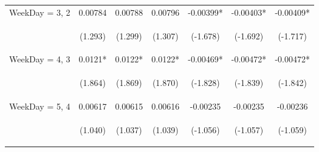 \documentclass[]{article}
\begin{document}
\begin{center}
\begin{tabular}{lcccccc}
WeekDay = 3, 2 & 0.00784 & 0.00788 & 0.00796 & -0.00399* & -0.00403* & -0.00409* \\
\vspace{4pt} & \begin{footnotesize}(1.293)\end{footnotesize} & \begin{footnotesize}(1.299)\end{footnotesize} & \begin{footnotesize}(1.307)\end{footnotesize} & \begin{footnotesize}(-1.678)\end{footnotesize} & \begin{footnotesize}(-1.692)\end{footnotesize} & \begin{footnotesize}(-1.717)\end{footnotesize} \\
WeekDay = 4, 3 & 0.0121* & 0.0122* & 0.0122* & -0.00469* & -0.00472* & -0.00472* \\
\vspace{4pt} & \begin{footnotesize}(1.864)\end{footnotesize} & \begin{footnotesize}(1.869)\end{footnotesize} & \begin{footnotesize}(1.870)\end{footnotesize} & \begin{footnotesize}(-1.828)\end{footnotesize} & \begin{footnotesize}(-1.839)\end{footnotesize} & \begin{footnotesize}(-1.842)\end{footnotesize} \\
WeekDay = 5, 4 & 0.00617 & 0.00615 & 0.00616 & -0.00235 & -0.00235 & -0.00236 \\
\vspace{4pt} & \begin{footnotesize}(1.040)\end{footnotesize} & \begin{footnotesize}(1.037)\end{footnotesize} & \begin{footnotesize}(1.039)\end{footnotesize} & \begin{footnotesize}(-1.056)\end{footnotesize} & \begin{footnotesize}(-1.057)\end{footnotesize} & \begin{footnotesize}(-1.059)\end{footnotesize} \\

\end{tabular}
\end{center}
\end{document}
